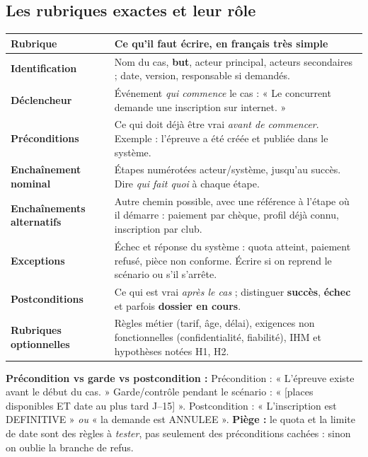 \documentclass[10pt,a4paper]{article}
\begin{document}
\subsection{Les rubriques exactes et leur rôle}
\begin{longtable}{@{}p{37mm}p{102mm}@{}}
\toprule
Rubrique & Ce qu'il faut écrire, en français très simple \\
\midrule\endhead
\textbf{Identification} & Nom du cas, \textbf{but}, acteur principal, acteurs secondaires ; date, version, responsable si demandés.\\
\textbf{Déclencheur} & Événement \emph{qui commence} le cas : « Le concurrent demande une inscription sur internet. »\\
\textbf{Préconditions} & Ce qui doit déjà être vrai \emph{avant de commencer}. Exemple : l'épreuve a été créée et publiée dans le système.\\
\textbf{Enchaînement nominal} & Étapes numérotées acteur/système, jusqu'au succès. Dire \emph{qui fait quoi} à chaque étape.\\
\textbf{Enchaînements alternatifs} & Autre chemin possible, avec une référence à l'étape où il démarre : paiement par chèque, profil déjà connu, inscription par club.\\
\textbf{Exceptions} & Échec et réponse du système : quota atteint, paiement refusé, pièce non conforme. Écrire si on reprend le scénario ou s'il s'arrête.\\
\textbf{Postconditions} & Ce qui est vrai \emph{après le cas} ; distinguer \textbf{succès}, \textbf{échec} et parfois \textbf{dossier en cours}.\\
\textbf{Rubriques optionnelles} & Règles métier (tarif, âge, délai), exigences non fonctionnelles (confidentialité, fiabilité), IHM et hypothèses notées H1, H2.\\
\bottomrule
\end{longtable}
\begin{memo}
\textbf{Précondition vs garde vs postcondition :}\newline
Précondition : « L'épreuve existe avant le début du cas. »\newline
Garde/contrôle pendant le scénario : « [places disponibles ET date au plus tard J--15] ».\newline
Postcondition : « L'inscription est DEFINITIVE » \emph{ou} « la demande est ANNULEE ».\newline
\textbf{Piège :} le quota et la limite de date sont des règles à \emph{tester}, pas seulement des préconditions cachées : sinon on oublie la branche de refus.
\end{memo}
\end{document}
